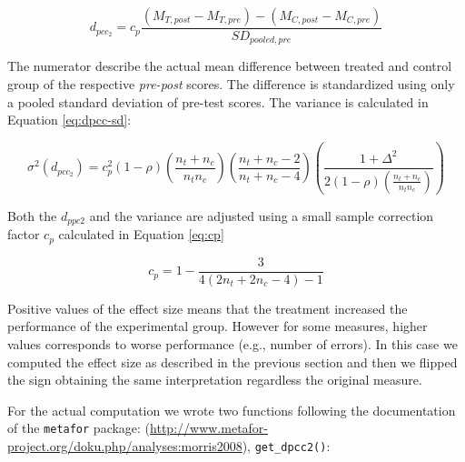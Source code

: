 \documentclass[
]{article}
\begin{document}
\begin{equation} 
  d_{pcc_2} = c_p \frac{(M_{T,post} - M_{T,pre}) - (M_{C,post} - M_{C,pre})}{SD_{pooled,pre}}
  \label{eq:dpcc}
\end{equation}

The numerator describe the actual mean difference between treated and control group of the respective \emph{pre-post} scores. The difference is standardized using only a pooled standard deviation of pre-test scores. The variance is calculated in Equation \eqref{eq:dpcc-sd}:

\begin{equation} 
  \sigma^2(d_{pcc_2}) = c^2_p(1-\rho)(\frac{n_t+n_c}{n_t n_c})(\frac{n_t+n_c-2}{n_t+n_c-4})(\frac{1 + \Delta^2}{2(1-\rho)(\frac{n_t+n_c}{n_t n_c})})
  \label{eq:dpcc-sd}
\end{equation}

Both the \(d_{ppc2}\) and the variance are adjusted using a small sample correction factor \(c_p\) calculated in Equation \eqref{eq:cp}

\begin{equation} 
  c_p = 1 - \frac{3}{4(2n_t + 2n_c - 4) - 1}
  \label{eq:cp}
\end{equation}

Positive values of the effect size means that the treatment increased the performance of the experimental group. However for some measures, higher values corresponds to worse performance (e.g., number of errors). In this case we computed the effect size as described in the previous section and then we flipped the sign obtaining the same interpretation regardless the original measure.

For the actual computation we wrote two functions following the documentation of the \texttt{metafor} package: (\url{http://www.metafor-project.org/doku.php/analyses:morris2008}), \texttt{get\_dpcc2()}:
\end{document}
